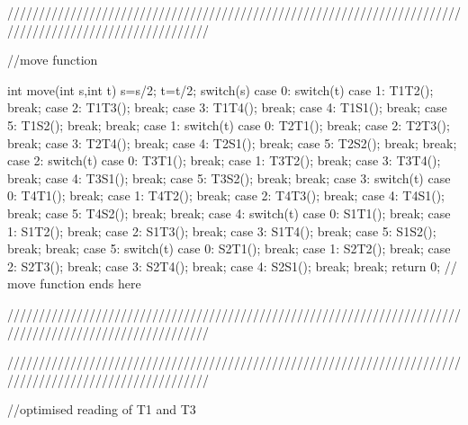 ////////////////////////////////////////////////////////////////////////////////////////////////////////

//move function

int move(int s,int t)
{
	s=s/2;
	t=t/2;
	switch(s)
	{
		case 0:
			switch(t)
			{
				case 1:
					T1T2();
					break;
				case 2:
					T1T3();
					break;
				case 3:
					T1T4();
					break;
				case 4:
					T1S1();
					break;
				case 5:
					T1S2();
					break;
			}
			break;
		case 1:
			switch(t)
			{
				case 0:
					T2T1();
					break;
				case 2:
					T2T3();
					break;
				case 3:
					T2T4();
					break;
				case 4:
					T2S1();
					break;
				case 5:
					T2S2();
					break;
			}
			break;
		case 2:
			switch(t)
			{
				case 0:
					T3T1();
					break;
				case 1:
					T3T2();
					break;
				case 3:
					T3T4();
					break;
				case 4:
					T3S1();
					break;
				case 5:
					T3S2();
					break;
			}
			break;
		case 3:
			switch(t)
			{
				case 0:
					T4T1();
					break;
				case 1:
					T4T2();
					break;
				case 2:
					T4T3();
					break;
				case 4:
					T4S1();
					break;
				case 5:
					T4S2();
					break;
			}
			break;
		case 4:
			switch(t)
			{
				case 0:
					S1T1();
					break;
				case 1:
					S1T2();
					break;
				case 2:
					S1T3();
					break;
				case 3:
					S1T4();
					break;
				case 5:
					S1S2();
					break;
			}
			break;
		case 5:
			switch(t)
			{
				case 0:
					S2T1();
					break;
				case 1:
					S2T2();
					break;
				case 2:
					S2T3();
					break;
				case 3:
					S2T4();
					break;
				case 4:
					S2S1();
					break;
			}
			break;
	}
	return 0;
}
// move function ends here

////////////////////////////////////////////////////////////////////////////////////////////////////////





////////////////////////////////////////////////////////////////////////////////////////////////////////

//optimised reading of T1 and T3

